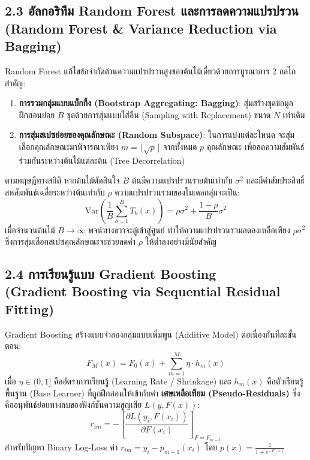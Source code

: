 \documentclass[12pt,a4paper]{article}
\begin{document}
\subsection*{2.3 อัลกอริทึม Random Forest และการลดความแปรปรวน\\ \normalsize(Random Forest \& Variance Reduction via Bagging)}
Random Forest แก้ไขข้อจำกัดด้านความแปรปรวนสูงของต้นไม้เดี่ยวด้วยการบูรณาการ 2 กลไกสำคัญ:
\begin{enumerate}[leftmargin=18pt, itemsep=2pt]
    \item \textbf{การรวมกลุ่มแบบแบ็กกิ้ง (Bootstrap Aggregating: Bagging)}: สุ่มสร้างชุดข้อมูลฝึกสอนย่อย $B$ ชุดด้วยการสุ่มแบบใส่คืน (Sampling with Replacement) ขนาด $N$ เท่าเดิม
    \item \textbf{การสุ่มสเปซย่อยของคุณลักษณะ (Random Subspace)}: ในการแบ่งแต่ละโหนด จะสุ่มเลือกคุณลักษณะมาพิจารณาเพียง $m = \lfloor\sqrt{p}\rfloor$ จากทั้งหมด $p$ คุณลักษณะ เพื่อลดความสัมพันธ์ร่วมกันระหว่างต้นไม้แต่ละต้น (Tree Decorrelation)
\end{enumerate}

ตามทฤษฎีทางสถิติ หากต้นไม้ตัดสินใจ $B$ ต้นมีความแปรปรวนรายต้นเท่ากับ $\sigma^2$ และมีค่าสัมประสิทธิ์สหสัมพันธ์เฉลี่ยระหว่างต้นเท่ากับ $\rho$ ความแปรปรวนรวมของโมเดลกลุ่มจะเป็น:
\begin{equation}
    \text{Var}\left(\frac{1}{B}\sum_{b=1}^B T_b(x)\right) = \rho \sigma^2 + \frac{1 - \rho}{B}\sigma^2
\end{equation}
เมื่อจำนวนต้นไม้ $B \to \infty$ พจน์ทางขวาจะลู่เข้าสู่ศูนย์ ทำให้ความแปรปรวนรวมลดลงเหลือเพียง $\rho \sigma^2$ ซึ่งการสุ่มเลือกสเปซคุณลักษณะจะช่วยลดค่า $\rho$ ให้ต่ำลงอย่างมีนัยสำคัญ

\subsection*{2.4 การเรียนรู้แบบ Gradient Boosting\\ \normalsize(Gradient Boosting via Sequential Residual Fitting)}
Gradient Boosting สร้างแบบจำลองกลุ่มแบบเพิ่มพูน (Additive Model) ต่อเนื่องกันทีละขั้นตอน:
\begin{equation}
    F_M(x) = F_0(x) + \sum_{m=1}^M \eta \cdot h_m(x)
\end{equation}
เมื่อ $\eta \in (0, 1]$ คืออัตราการเรียนรู้ (Learning Rate / Shrinkage) และ $h_m(x)$ คือตัวเรียนรู้พื้นฐาน (Base Learner) ที่ถูกฝึกสอนให้เข้ากับค่า \textbf{เศษเหลือเทียม (Pseudo-Residuals)} ซึ่งคืออนุพันธ์ย่อยทางลบของฟังก์ชันความสูญเสีย $L(y, F(x))$:
\begin{equation}
    r_{im} = -\left[\frac{\partial L(y_i, F(x_i))}{\partial F(x_i)}\right]_{F = F_{m-1}}
\end{equation}
สำหรับปัญหา Binary Log-Loss ค่า $r_{im} = y_i - p_{m-1}(x_i)$ โดย $p(x) = \frac{1}{1 + e^{-F(x)}}$
\end{document}
